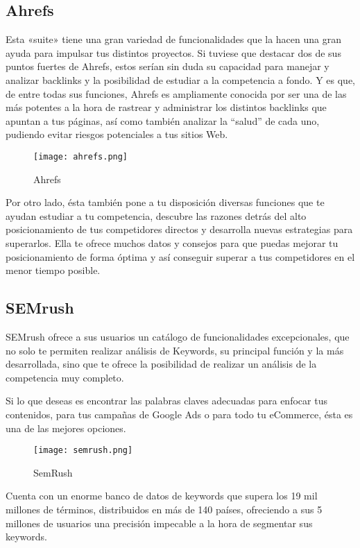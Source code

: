 \subsection{Ahrefs}

Esta «suite» tiene una gran variedad de funcionalidades que la hacen una gran ayuda para impulsar tus distintos proyectos. Si tuviese que destacar dos de sus puntos fuertes de Ahrefs, estos serían sin duda su capacidad para manejar  y analizar backlinks y la posibilidad de estudiar a la competencia a fondo.
Y es que, de entre todas sus funciones, Ahrefs es ampliamente conocida por ser una de las más potentes a la hora de rastrear y administrar los distintos backlinks que apuntan a tus páginas, así como también analizar la “salud” de cada uno, pudiendo evitar riesgos potenciales a tus sitios Web.

\begin{figure}[ht!]
    \texttt{[image: ahrefs.png]}
    \caption{Ahrefs}
    \label{image-ahrefs}
\end{figure}

Por otro lado, ésta también pone a tu disposición diversas funciones que te ayudan estudiar a tu competencia, descubre las razones detrás del alto posicionamiento de tus competidores directos y desarrolla nuevas estrategias para superarlos. Ella te ofrece muchos datos y consejos para que puedas mejorar tu posicionamiento de forma óptima y así conseguir superar a tus competidores en el menor tiempo posible.

\subsection{SEMrush}

SEMrush ofrece a sus usuarios un catálogo de funcionalidades excepcionales, que no solo te permiten realizar análisis de Keywords, su principal función y la más desarrollada, sino que te ofrece la posibilidad de realizar un análisis de la competencia muy completo.

Si lo que deseas es encontrar las palabras claves adecuadas para enfocar tus contenidos, para tus campañas de Google Ads o para todo tu eCommerce, ésta es una de las mejores opciones.

\begin{figure}[ht!]
    \texttt{[image: semrush.png]}
    \caption{SemRush}
    \label{image-semrush}
\end{figure}

Cuenta con un enorme banco de datos de keywords que supera los 19 mil millones de términos, distribuidos en más de 140 países, ofreciendo a sus 5 millones de usuarios una precisión impecable a la hora de segmentar sus keywords.

